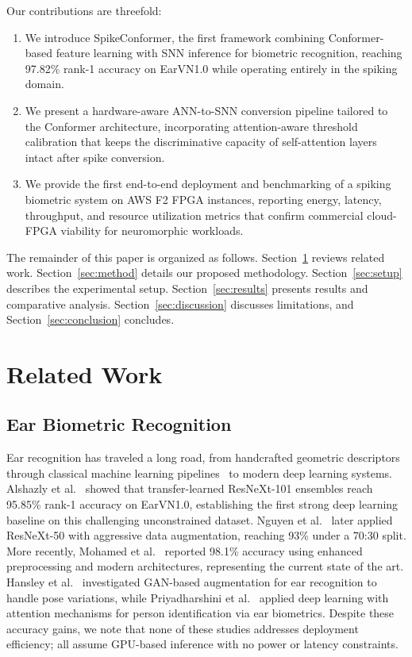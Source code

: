 \documentclass[11pt,a4paper]{article}
\begin{document}
Our contributions are threefold:
\begin{enumerate}
    \item We introduce SpikeConformer, the first framework combining Conformer-based feature learning with SNN inference for biometric recognition, reaching 97.82\% rank-1 accuracy on EarVN1.0 while operating entirely in the spiking domain.
    \item We present a hardware-aware ANN-to-SNN conversion pipeline tailored to the Conformer architecture, incorporating attention-aware threshold calibration that keeps the discriminative capacity of self-attention layers intact after spike conversion.
    \item We provide the first end-to-end deployment and benchmarking of a spiking biometric system on AWS F2 FPGA instances, reporting energy, latency, throughput, and resource utilization metrics that confirm commercial cloud-FPGA viability for neuromorphic workloads.
\end{enumerate}

The remainder of this paper is organized as follows. Section~\ref{sec:related} reviews related work. Section~\ref{sec:method} details our proposed methodology. Section~\ref{sec:setup} describes the experimental setup. Section~\ref{sec:results} presents results and comparative analysis. Section~\ref{sec:discussion} discusses limitations, and Section~\ref{sec:conclusion} concludes.

\section{Related Work}\label{sec:related}

\subsection{Ear Biometric Recognition}

Ear recognition has traveled a long road, from handcrafted geometric descriptors~\cite{burge2000ear, yuan2006ear} through classical machine learning pipelines~\cite{kumar2012automated} to modern deep learning systems. Alshazly et al.~\cite{alshazly2020deep} showed that transfer-learned ResNeXt-101 ensembles reach 95.85\% rank-1 accuracy on EarVN1.0, establishing the first strong deep learning baseline on this challenging unconstrained dataset. Nguyen et al.~\cite{nguyen2022ear} later applied ResNeXt-50 with aggressive data augmentation, reaching 93\% under a 70:30 split. More recently, Mohamed et al.~\cite{mohamed2024advancing} reported 98.1\% accuracy using enhanced preprocessing and modern architectures, representing the current state of the art. Hansley et al.~\cite{hansley2018employing} investigated GAN-based augmentation for ear recognition to handle pose variations, while Priyadharshini et al.~\cite{zhang2023ear} applied deep learning with attention mechanisms for person identification via ear biometrics. Despite these accuracy gains, we note that none of these studies addresses deployment efficiency; all assume GPU-based inference with no power or latency constraints.
\end{document}
